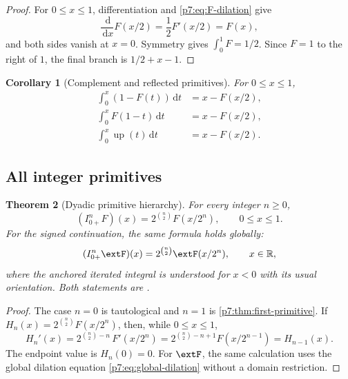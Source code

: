 \documentclass[11pt,oneside]{article}
\newtheorem{theorem}{Theorem}[section]
\newtheorem{corollary}[theorem]{Corollary}
\theoremstyle{definition}
\theoremstyle{remark}
\newcommand{\Up}{\operatorname{up}}
\newcommand{\R}{\mathbb R}
\newcommand{\dd}{\,\mathrm d}
\newcommand{\1}{\mathbf 1}
\begin{document}
\begin{proof}
For $0\le x\le1$, differentiation and \cref{p7:eq:F-dilation} give
\[
 \frac{\dd}{\dd x}F(x/2)=\frac12F'(x/2)=F(x),
\]
and both sides vanish at $x=0$.  Symmetry gives $\int_0^1F=1/2$.  Since $F=1$ to the
right of $1$, the final branch is $1/2+x-1$.
\end{proof}

\begin{corollary}[Complement and reflected primitives]
For $0\le x\le1$,
\begin{align}
 \int_0^x(1-F(t))\dd t
 &=x-F(x/2),\label{p7:eq:complement-primitive}\\
 \int_0^xF(1-t)\dd t
 &=x-F(x/2),\label{p7:eq:reflected-primitive}\\
 \int_0^x\Up(t)\dd t
 &=x-F(x/2).\label{p7:eq:up-positive-primitive}
\end{align}
\end{corollary}

\subsection{All integer primitives}

\begin{theorem}[Dyadic primitive hierarchy]
\label{p7:thm:integer-primitives}
For every integer $n\ge0$,
\begin{equation}
 (I_{0+}^{n}F)(x)=2^{\binom n2}F(x/2^n),
 \qquad 0\le x\le1.
 \label{p7:eq:F-n-primitive}
\end{equation}
For the signed continuation, the same formula holds globally:
\begin{equation}
 (I_{0+}^{n}\extF)(x)=2^{\binom n2}\extF(x/2^n),
 \qquad x\in\R,
 \label{p7:eq:global-n-primitive}
\end{equation}
where the anchored iterated integral is understood for $x<0$ with its usual orientation.
Both statements are \statusproved.
\end{theorem}

\begin{proof}
The case $n=0$ is tautological and $n=1$ is \cref{p7:thm:first-primitive}.  If
$H_n(x)=2^{\binom n2}F(x/2^n)$, then, while $0\le x\le1$,
\[
 H_n'(x)=2^{\binom n2-n}\,F'(x/2^n)
 =2^{\binom n2-n+1}F(x/2^{n-1})
 =H_{n-1}(x).
\]
The endpoint value is $H_n(0)=0$.  For $\extF$, the same calculation uses the global
dilation equation \cref{p7:eq:global-dilation} without a domain restriction.
\end{proof}
\end{document}
